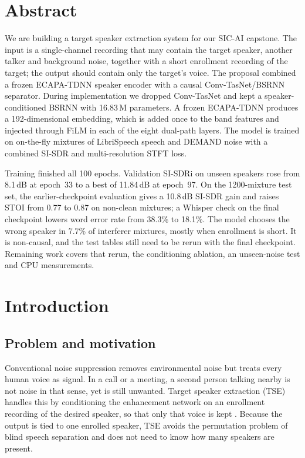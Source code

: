 \documentclass[11pt,a4paper]{article}
\newcommand{\sisdr}{SI-SDR}
\newcommand{\sisdri}{SI-SDRi}
\begin{document}
\section*{Abstract}
We are building a target speaker extraction system for our SIC-AI capstone. The input is a
single-channel recording that may contain the target speaker, another talker and background noise,
together with a short enrollment recording of the target; the output should contain only the
target's voice. The proposal combined a frozen ECAPA-TDNN speaker encoder with a causal
Conv-TasNet/BSRNN separator. During implementation we dropped Conv-TasNet and kept a
speaker-conditioned BSRNN with 16.83\,M parameters. A frozen ECAPA-TDNN produces a
192-dimensional embedding, which is added once to the band features and injected through FiLM in
each of the eight dual-path layers. The model is trained on on-the-fly mixtures of LibriSpeech
speech and DEMAND noise with a combined \sisdr{} and multi-resolution STFT loss.

Training finished all 100 epochs. Validation \sisdri{} on unseen speakers rose from 8.1\,dB at
epoch~33 to a best of 11.84\,dB at epoch~97. On the 1200-mixture test set, the earlier-checkpoint
evaluation gives a 10.8\,dB \sisdr{} gain and raises STOI from 0.77 to 0.87 on non-clean mixtures;
a Whisper check on the final checkpoint lowers word error rate from 38.3\% to 18.1\%. The model
chooses the wrong speaker in 7.7\% of interferer mixtures, mostly when enrollment is short. It is
non-causal, and the test tables still need to be rerun with the final checkpoint. Remaining work
covers that rerun, the conditioning ablation, an unseen-noise test and CPU measurements.

\newpage
\begingroup
\small
\setlength{\parskip}{0pt}
\tableofcontents
\endgroup
\newpage

\section{Introduction}

\subsection{Problem and motivation}
Conventional noise suppression removes environmental noise but treats every human voice as
signal. In a call or a meeting, a second person talking nearby is not noise in that sense, yet is
still unwanted. Target speaker extraction (TSE) handles this by conditioning the enhancement
network on an enrollment recording of the desired speaker, so that only that voice is kept
\cite{wang2019voicefilter, sato2024speakerbeamss}. Because the output is tied to one enrolled
speaker, TSE avoids the permutation problem of blind speech separation and does not need to know
how many speakers are present.
\end{document}
